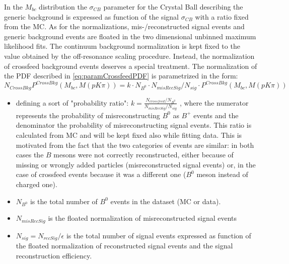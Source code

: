 In the $M_{bc}$ distribution the $\sigma_{CB}$ parameter for the Crystal Ball describing the generic background is expressed as function of the signal $\sigma_{CB}$  with a ratio fixed from the MC. 
\noindent As for the normalizations, mis-/reconstructed signal events and generic background events are floated in the two dimensional unbinned maximum likelihood fits. 
The continuum background normalization is kept fixed to the value obtained by the off-resonance scaling procedure.  Instead, the normalization of crossfeed background events deserves a special treatment.
The normalization of the PDF described in \cref{eq:paramCrossfeedPDF} is parametrized in the form:
\begin{equation}
N_{CrossBkg} P^{CrossBkg}(M_{bc}, M(p K \pi)) = k \cdot N_{B^0} \cdot N_{misRecSig} / N_{sig} \cdot  P^{CrossBkg}(M_{bc}, M(p K \pi)) 
\label{eq:paramCrossfeedNorm}
\end{equation}
\begin{itemize}
\item defining a sort of "probability ratio": $k = \frac{N_{crossfeed }/  N_{B^0}}{N_{misRecSig} /  N_{sig} }$ , where the numerator represents the probability of misreconstructing $B^0$ as $B^+$ events
and the denominator the probability of misreconstructing signal events. This ratio is calculated from MC and will be kept fixed also while fitting data. This is motivated from the fact that 
the two categories of events are similar: in both cases the $B$ mesons were not correctly reconstructed, either because of missing or wrongly added particles (misreconstructed signal events) or, in the case
of crossfeed events because it was a different one ($B^0$ meson instead of charged one). \\
\item  $N_{B^0} $ is the total number of $B^0$ events in the dataset (MC or data). 
\item $N_{misRecSig}$ is the floated normalization of misreconstructed signal events
\item $ N_{sig}  =  N_{recSig} / \epsilon$ is the total number of signal events expressed as function of the floated normalization of reconstructed signal events and the signal reconstruction efficiency. 
\end{itemize}



